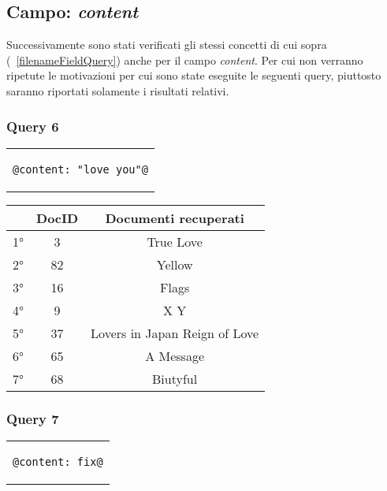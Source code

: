 \documentclass{article}
\begin{document}
\subsection{Campo: \textit{content}}
Successivamente sono stati verificati gli stessi concetti di cui sopra (~\ref{filenameFieldQuery}) anche per il campo \textit{content}. Per cui non verranno ripetute le motivazioni per cui sono state eseguite le seguenti query, piuttosto saranno riportati solamente i risultati relativi.

\newpage
\subsubsection{Query 6}
\begin{center}
\begin{tabular}{c}
\begin{lstlisting}[style=prompt]
    @content: "love you"@
\end{lstlisting}
\end{tabular}    
\end{center}

\begin{table}[h!]
\centering
    \begin{tabular}{|c|c|c|}
    \hline
    & DocID & Documenti recuperati\\
    \hline
    1° & 3 & True Love\\
    \hline
    2° & 82 & Yellow\\
    \hline
    3° & 16 & Flags\\
    \hline
    4° & 9 & X Y\\
    \hline
    5° & 37 & Lovers in Japan Reign of Love\\
    \hline
    6° & 65 & A Message\\
    \hline
    7° & 68 & Biutyful\\
    \hline
\end{tabular}
\end{table}

\subsubsection{Query 7}
\begin{center}
\begin{tabular}{c}
\begin{lstlisting}[style=prompt]
    @content: fix@
\end{lstlisting}
\end{tabular}    
\end{center}
\end{document}
